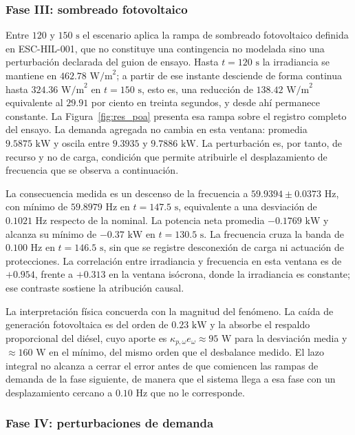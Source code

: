 \subsubsection{Fase III: sombreado fotovoltaico}

Entre $120$ y $150\text{ s}$ el escenario aplica la rampa de sombreado fotovoltaico definida en ESC-HIL-001, que no constituye una contingencia no modelada sino una perturbación declarada del guion de ensayo. Hasta $t = 120\text{ s}$ la irradiancia se mantiene en $462.78\text{ W/m}^2$; a partir de ese instante desciende de forma continua hasta $324.36\text{ W/m}^2$ en $t = 150\text{ s}$, esto es, una reducción de $138.42\text{ W/m}^2$ equivalente al $29.91$ por ciento en treinta segundos, y desde ahí permanece constante. La Figura~\ref{fig:res_poa} presenta esa rampa sobre el registro completo del ensayo. La demanda agregada no cambia en esta ventana: promedia $9.5875\text{ kW}$ y oscila entre $9.3935$ y $9.7886\text{ kW}$. La perturbación es, por tanto, de recurso y no de carga, condición que permite atribuirle el desplazamiento de frecuencia que se observa a continuación.

La consecuencia medida es un descenso de la frecuencia a $59.9394 \pm 0.0373\text{ Hz}$, con mínimo de $59.8979\text{ Hz}$ en $t = 147.5\text{ s}$, equivalente a una desviación de $0.1021\text{ Hz}$ respecto de la nominal. La potencia neta promedia $-0.1769\text{ kW}$ y alcanza su mínimo de $-0.37\text{ kW}$ en $t = 130.5\text{ s}$. La frecuencia cruza la banda de $0.100\text{ Hz}$ en $t = 146.5\text{ s}$, sin que se registre desconexión de carga ni actuación de protecciones. La correlación entre irradiancia y frecuencia en esta ventana es de $+0.954$, frente a $+0.313$ en la ventana isócrona, donde la irradiancia es constante; ese contraste sostiene la atribución causal.

La interpretación física concuerda con la magnitud del fenómeno. La caída de generación fotovoltaica es del orden de $0.23\text{ kW}$ y la absorbe el respaldo proporcional del diésel, cuyo aporte es $\kappa_{p,\omega} e_\omega \approx 95\text{ W}$ para la desviación media y $\approx 160\text{ W}$ en el mínimo, del mismo orden que el desbalance medido. El lazo integral no alcanza a cerrar el error antes de que comiencen las rampas de demanda de la fase siguiente, de manera que el sistema llega a esa fase con un desplazamiento cercano a $0.10\text{ Hz}$ que no le corresponde.

\subsubsection{Fase IV: perturbaciones de demanda}

